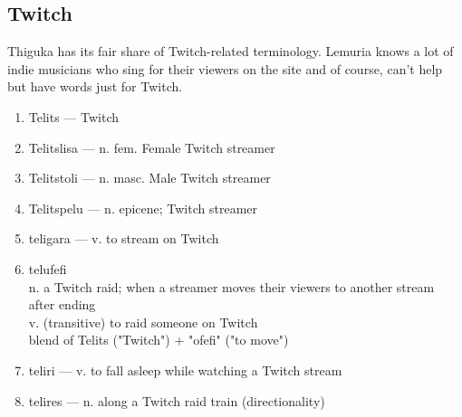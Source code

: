 \subsection{Twitch}
Thiguka has its fair share of Twitch-related terminology.
Lemuria knows a lot of indie musicians who sing for their viewers on the site and of course, can't help but have words just for Twitch.

\begin{enumerate}
\item Telits --- Twitch
\item Telitslisa --- n. fem. Female Twitch streamer
\item Telitstoli --- n. masc. Male Twitch streamer
\item Telitspelu --- n. epicene; Twitch streamer
\item teligara --- v. to stream on Twitch
\item telufefi \\ 
n. a Twitch raid; when a streamer moves their viewers to another stream after ending \\
v. (transitive) to raid someone on Twitch\\
blend of Telits ("Twitch") + "ofefi" ("to move")
\item teliri --- v. to fall asleep while watching a Twitch stream
\item telires --- n. along a Twitch raid train (directionality)
\end{enumerate}


